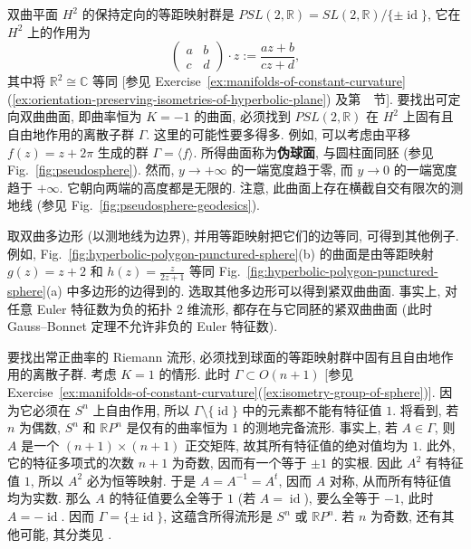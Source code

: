 \begin{RiemannExample}\label{ex:orientable-hyperbolic-surfaces}
双曲平面 $H^2$ 的保持定向的等距映射群是 $\mathit{PSL}(2,\mathbb{R})=\mathit{SL}(2,\mathbb{R})/\{\pm\operatorname{id}\}$, 它在 $H^2$ 上的作用为
\[
  \begin{pmatrix}a&b\\c&d\end{pmatrix}\cdot z:=\frac{az+b}{cz+d},
\]
其中将 $\mathbb{R}^2\cong\mathbb{C}$ 等同 [参见 Exercise~\ref{ex:manifolds-of-constant-curvature}(\ref{ex:orientation-preserving-isometries-of-hyperbolic-plane}) 及第~~节]. 要找出可定向双曲曲面, 即曲率恒为 $K=-1$ 的曲面, 必须找到 $\mathit{PSL}(2,\mathbb{R})$ 在 $H^2$ 上固有且自由地作用的离散子群 $\Gamma$. 这里的可能性要多得多. 例如, 可以考虑由平移 $f(z)=z+2\pi$ 生成的群 $\Gamma=\langle f\rangle$. 所得曲面称为\textbf{伪球面}, 与圆柱面同胚 (参见 Fig.~\ref{fig:pseudosphere}). 然而, $y\to+\infty$ 的一端宽度趋于零, 而 $y\to0$ 的一端宽度趋于 $+\infty$. 它朝向两端的高度都是无限的. 注意, 此曲面上存在横截自交有限次的测地线 (参见 Fig.~\ref{fig:pseudosphere-geodesics}).
\end{RiemannExample}

取双曲多边形 (以测地线为边界), 并用等距映射把它们的边等同, 可得到其他例子. 例如, Fig.~\ref{fig:hyperbolic-polygon-punctured-sphere}(b) 的曲面是由等距映射 $g(z)=z+2$ 和 $h(z)=\frac{z}{2z+1}$ 等同 Fig.~\ref{fig:hyperbolic-polygon-punctured-sphere}(a) 中多边形的边得到的. 选取其他多边形可以得到紧双曲曲面. 事实上, 对任意 Euler 特征数为负的拓扑 2 维流形, 都存在与它同胚的紧双曲曲面 (此时 Gauss–Bonnet 定理不允许非负的 Euler 特征数).

\begin{RiemannExample}\label{ex:even-dimensional-positive-curvature-quotients}
要找出常正曲率的 Riemann 流形, 必须找到球面的等距映射群中固有且自由地作用的离散子群. 考虑 $K=1$ 的情形. 此时 $\Gamma\subset O(n+1)$ [参见 Exercise~\ref{ex:manifolds-of-constant-curvature}(\ref{ex:isometry-group-of-sphere})]. 因为它必须在 $S^n$ 上自由作用, 所以 $\Gamma\setminus\{\operatorname{id}\}$ 中的元素都不能有特征值 $1$. 将看到, 若 $n$ 为偶数, $S^n$ 和 $\mathbb{R}P^n$ 是仅有的曲率恒为 $1$ 的测地完备流形. 事实上, 若 $A\in\Gamma$, 则 $A$ 是一个 $(n+1)\times(n+1)$ 正交矩阵, 故其所有特征值的绝对值均为 $1$. 此外, 它的特征多项式的次数 $n+1$ 为奇数, 因而有一个等于 $\pm1$ 的实根. 因此 $A^2$ 有特征值 $1$, 所以 $A^2$ 必为恒等映射. 于是 $A=A^{-1}=A^t$, 因而 $A$ 对称, 从而所有特征值均为实数. 那么 $A$ 的特征值要么全等于 $1$ (若 $A=\operatorname{id}$), 要么全等于 $-1$, 此时 $A=-\operatorname{id}$. 因而 $\Gamma=\{\pm\operatorname{id}\}$, 这蕴含所得流形是 $S^n$ 或 $\mathbb{R}P^n$. 若 $n$ 为奇数, 还有其他可能, 其分类见 .
\end{RiemannExample}

